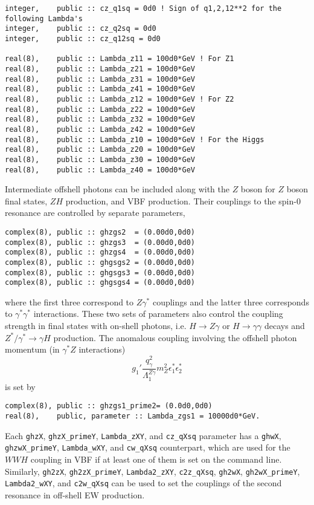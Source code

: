 \documentclass[aps,superscriptaddress,nofootinbib]{revtex4}
\begin{document}
\begin{verbatim}
integer,    public :: cz_q1sq = 0d0 ! Sign of q1,2,12**2 for the following Lambda's
integer,    public :: cz_q2sq = 0d0
integer,    public :: cz_q12sq = 0d0

real(8),    public :: Lambda_z11 = 100d0*GeV ! For Z1
real(8),    public :: Lambda_z21 = 100d0*GeV
real(8),    public :: Lambda_z31 = 100d0*GeV
real(8),    public :: Lambda_z41 = 100d0*GeV
real(8),    public :: Lambda_z12 = 100d0*GeV ! For Z2
real(8),    public :: Lambda_z22 = 100d0*GeV
real(8),    public :: Lambda_z32 = 100d0*GeV
real(8),    public :: Lambda_z42 = 100d0*GeV
real(8),    public :: Lambda_z10 = 100d0*GeV ! For the Higgs
real(8),    public :: Lambda_z20 = 100d0*GeV
real(8),    public :: Lambda_z30 = 100d0*GeV
real(8),    public :: Lambda_z40 = 100d0*GeV
\end{verbatim}

Intermediate offshell photons can be included along with the $Z$ boson for $Z$ boson final states, $ZH$ production, and VBF production.
Their couplings to the spin-0 resonance are controlled by separate parameters,
\begin{verbatim}
complex(8), public :: ghzgs2  = (0.00d0,0d0)
complex(8), public :: ghzgs3  = (0.00d0,0d0)
complex(8), public :: ghzgs4  = (0.00d0,0d0)
complex(8), public :: ghgsgs2 = (0.00d0,0d0)
complex(8), public :: ghgsgs3 = (0.00d0,0d0)
complex(8), public :: ghgsgs4 = (0.00d0,0d0)
\end{verbatim}
where the first three correspond to $Z\gamma^*$ couplings and the latter three corresponds to $\gamma^* \gamma^*$ interactions.
These two sets of parameters also control the coupling strength in final states with on-shell photons, i.e. $H\to Z\gamma$ or $H\to \gamma\gamma$ decays and $Z^*/\gamma^*\to\gamma H$ production.
The anomalous coupling involving the offshell photon momentum (in $\gamma^* Z$ interactions)
\[
g_1' \frac{ q^2_\gamma }{ \Lambda_1^{Z\gamma} } m_Z^2 \epsilon^*_1 \epsilon^*_2
\]
is set by
\begin{verbatim}
complex(8), public :: ghzgs1_prime2= (0.0d0,0d0)
real(8),    public, parameter :: Lambda_zgs1 = 10000d0*GeV.
\end{verbatim}

Each \verb|ghzX|, \verb|ghzX_primeY|, \verb|Lambda_zXY|, and \verb|cz_qXsq| parameter has a \verb|ghwX|, \verb|ghzwX_primeY|, \verb|Lambda_wXY|, and \verb|cw_qXsq| counterpart, which are used for the $WWH$ coupling in VBF if at least one of them is set on the command line.  Similarly, \verb|gh2zX|, \verb|gh2zX_primeY|, \verb|Lambda2_zXY|, \verb|c2z_qXsq|, \verb|gh2wX|, \verb|gh2wX_primeY|, \verb|Lambda2_wXY|, and \verb|c2w_qXsq| can be used to set the couplings of the second resonance in off-shell EW production.\\
\end{document}
